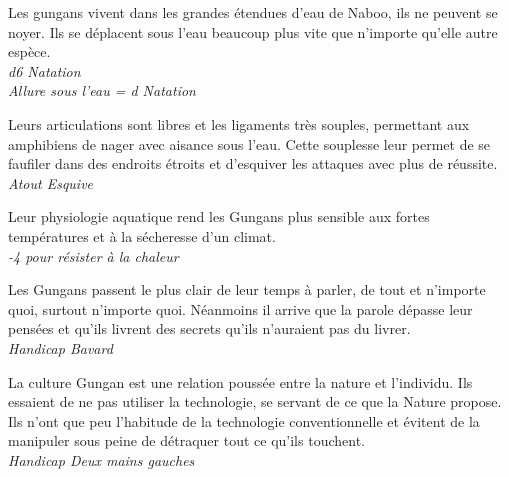 \begin{description}[align=left]
\item [Aquatique] 					%
		Les gungans vivent dans les grandes étendues d’eau de Naboo, ils ne peuvent se noyer. Ils se déplacent sous l’eau beaucoup plus vite que n’importe qu’elle autre espèce.\\
		\emph{d6 Natation}\\
		\emph{Allure sous l’eau = d Natation}
		
\item [Mollusque] 					%
		Leurs articulations sont libres et les ligaments très souples, permettant aux amphibiens de nager avec aisance sous l’eau. Cette souplesse leur permet de se faufiler dans des endroits étroits et d’esquiver les attaques avec plus de réussite.\\
		\emph{Atout Esquive}

\item [Craint la chaleur] 			%
		Leur physiologie aquatique rend les Gungans plus sensible aux fortes températures et à la sécheresse d’un climat.\\
		\emph{-4 pour résister à la chaleur}

\item [Langue bien pendue] 			%
		Les Gungans passent le plus clair de leur temps à parler, de tout et n’importe quoi, surtout n’importe quoi. Néanmoins il arrive que la parole dépasse leur pensées et qu’ils livrent des secrets qu’ils n’auraient pas du livrer.\\
		\emph{Handicap Bavard}

\item [Maladroit] 					%
		La culture Gungan est une relation poussée entre la nature et l’individu. Ils essaient de ne pas utiliser la technologie, se servant de ce que la Nature propose. Ils n’ont que peu l’habitude de la technologie conventionnelle et évitent de la manipuler sous peine de détraquer tout ce qu’ils touchent.\\
		\emph{Handicap Deux mains gauches}
\end{description}